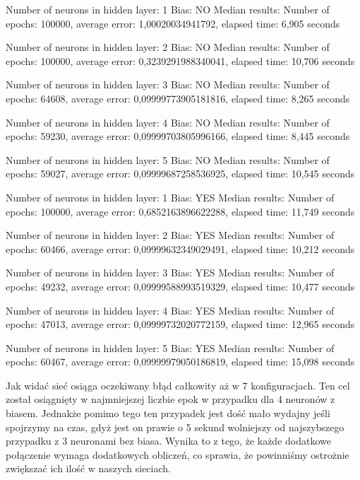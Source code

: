 \begin{scriptsize}  
  Number of neurons in hidden layer: 1
  Bias: NO
  Median results:
  Number of epochs: 100000, average error: 1,00020034941792, elapsed time: 6,905 seconds
  
  Number of neurons in hidden layer: 2
  Bias: NO
  Median results:
  Number of epochs: 100000, average error: 0,3239291988340041, elapsed time: 10,706 seconds
  
  Number of neurons in hidden layer: 3
  Bias: NO
  Median results:
  Number of epochs: 64608, average error: 0,09999773905181816, elapsed time: 8,265 seconds
  
  Number of neurons in hidden layer: 4
  Bias: NO
  Median results:
  Number of epochs: 59230, average error: 0,09999703805996166, elapsed time: 8,445 seconds
  
  Number of neurons in hidden layer: 5
  Bias: NO
  Median results:
  Number of epochs: 59027, average error: 0,09999687258536925, elapsed time: 10,545 seconds
  
  Number of neurons in hidden layer: 1
  Bias: YES
  Median results:
  Number of epochs: 100000, average error: 0,6852163896622288, elapsed time: 11,749 seconds
  
  Number of neurons in hidden layer: 2
  Bias: YES
  Median results:
  Number of epochs: 60466, average error: 0,09999632349029491, elapsed time: 10,212 seconds
  
  Number of neurons in hidden layer: 3
  Bias: YES
  Median results:
  Number of epochs: 49232, average error: 0,09999588993519329, elapsed time: 10,477 seconds
  
  Number of neurons in hidden layer: 4
  Bias: YES
  Median results:
  Number of epochs: 47013, average error: 0,09999732020772159, elapsed time: 12,965 seconds
  
  Number of neurons in hidden layer: 5
  Bias: YES
  Median results:
  Number of epochs: 60467, average error: 0,09999979050186819, elapsed time: 15,098 seconds
  
\end{scriptsize}

Jak widać sieć osiąga oczekiwany błąd całkowity aż w 7 konfiguracjach.
Ten cel został osiągnięty w najmniejszej liczbie epok w przypadku dla 4 neuronów z biasem.
Jednakże pomimo tego ten przypadek jest dość mało wydajny jeśli spojrzymy na czas, 
gdyż jest on prawie o 5 sekund wolniejszy od najszybszego przypadku z 3 neuronami bez biasa.
Wynika to z tego, że każde dodatkowe połączenie wymaga dodatkowych obliczeń,
co sprawia, że powinniśmy ostrożnie zwiększać ich ilość w naszych sieciach.